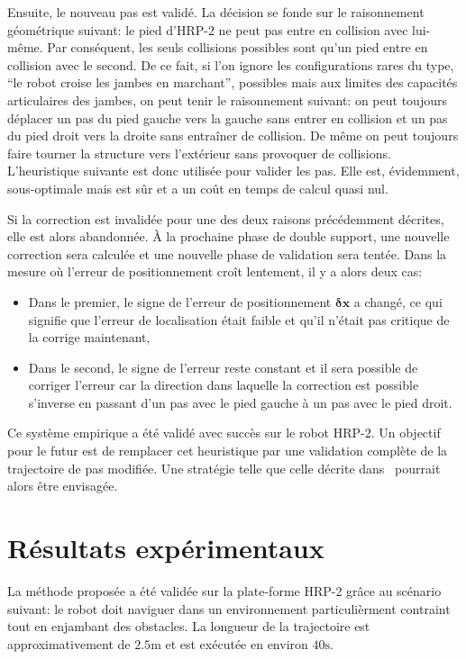 Ensuite, le nouveau pas est validé. La décision se fonde sur le
raisonnement géométrique suivant: le pied d'HRP-2 ne peut pas entre en
collision avec lui-même. Par conséquent, les seuls collisions
possibles sont qu'un pied entre en collision avec le second. De ce
fait, si l'on ignore les configurations rares du type, ``le robot
croise les jambes en marchant'', possibles mais aux limites des
capacités articulaires des jambes, on peut tenir le raisonnement
suivant: on peut toujours déplacer un pas du pied gauche vers la
gauche sans entrer en collision et un pas du pied droit vers la droite
sans entraîner de collision. De même on peut toujours faire tourner la
structure vers l'extérieur sans provoquer de collisions. L'heuristique
suivante est donc utilisée pour valider les pas. Elle est, évidemment,
sous-optimale mais est sûr et a un coût en temps de calcul quasi nul.


Si la correction est invalidée pour une des deux raisons précédemment
décrites, elle est alors abandonnée. À la prochaine phase de double
support, une nouvelle correction sera calculée et une nouvelle phase
de validation sera tentée. Dans la mesure où l'erreur de
positionnement croît lentement, il y a alors deux cas:
\begin{itemize}
\item Dans le premier, le signe de l'erreur de positionnement
  $\mathbf{\delta {x}}$ a changé, ce qui signifie que l'erreur de
  localisation était faible et qu'il n'était pas critique de la
  corrige maintenant,
\item Dans le second, le signe de l'erreur reste constant et il sera
  possible de corriger l'erreur car la direction dans laquelle la
  correction est possible s'inverse en passant d'un pas avec le pied
  gauche à un pas avec le pied droit.
\end{itemize}

Ce système empirique a été validé avec succès sur le robot HRP-2. Un
objectif pour le futur est de remplacer cet heuristique par une
validation complète de la trajectoire de pas modifiée. Une stratégie
telle que celle décrite dans~\cite{10icra.perrin} pourrait alors être
envisagée.

\section{Résultats expérimentaux}\label{exp}


La méthode proposée a été validée sur la plate-forme HRP-2 grâce au
scénario suivant: le robot doit naviguer dans un environnement
particulièrment contraint tout en enjambant des obstacles. La longueur
de la trajectoire est approximativement de $2.5\mathrm{m}$ et est
exécutée en environ $40\mathrm{s}$.


